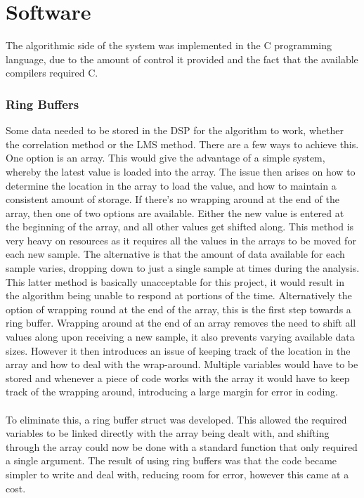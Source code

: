 \section{Software}
The algorithmic side of the system was implemented in the C programming language, due to the amount of control it provided and the fact that the available compilers required C.

\subsubsection{Ring Buffers}

Some data needed to be stored in the DSP for the algorithm to work, whether the correlation method or the LMS method.
There are a few ways to achieve this.
One option is an array.
This would give the advantage of a simple system, whereby the latest value is loaded into the array.
The issue then arises on how to determine the location in the array to load the value, and how to maintain a consistent amount of storage.
If there's no wrapping around at the end of the array, then one of two options are available.
Either the new value is entered at the beginning of the array, and all other values get shifted along.
This method is very heavy on resources as it requires all the values in the arrays to be moved for each new sample.
The alternative is that the amount of data available for each sample varies, dropping down to just a single sample at times during the analysis.
This latter method is basically unacceptable for this project, it would result in the algorithm being unable to respond at portions of the time.
Alternatively the option of wrapping round at the end of the array, this is the first step towards a ring buffer.
Wrapping around at the end of an array removes the need to shift all values along upon receiving a new sample, it also prevents varying available data sizes.
However it then introduces an issue of keeping track of the location in the array and how to deal with the wrap-around.
Multiple variables would have to be stored and whenever a piece of code works with the array it would have to keep track of the wrapping around, introducing a large margin for error in coding.
\\
\\
To eliminate this, a ring buffer struct was developed.
This allowed the required variables to be linked directly with the array being dealt with, and shifting through the array could now be done with a standard function that only required a single argument.
The result of using ring buffers was that the code became simpler to write and deal with, reducing room for error, however this came at a cost.
